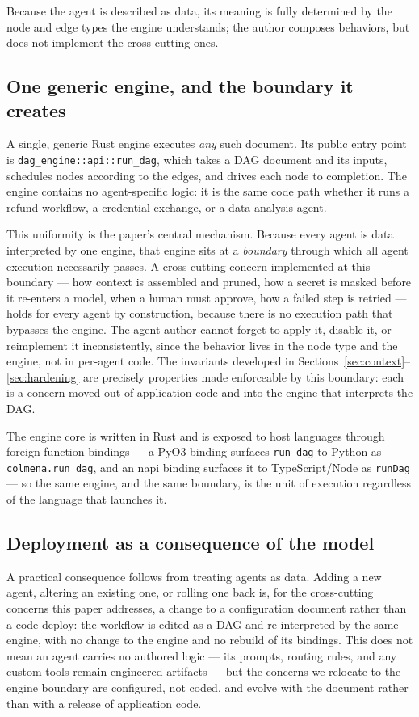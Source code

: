 Because the agent is described as data, its meaning is fully determined by the
node and edge types the engine understands; the author composes behaviors, but
does not implement the cross-cutting ones.

\subsection{One generic engine, and the boundary it creates}
\label{subsec:engine}

A single, generic Rust engine executes \emph{any} such document. Its public entry
point is \texttt{dag\_engine::\allowbreak api::\allowbreak run\_dag}, which takes
a DAG document and its
inputs, schedules nodes according to the edges, and drives each node to
completion. The engine contains no agent-specific logic: it is the same code path
whether it runs a refund workflow, a credential exchange, or a data-analysis
agent.

This uniformity is the paper's central mechanism. Because every agent is data
interpreted by one engine, that engine sits at a \emph{boundary} through which all
agent execution necessarily passes. A cross-cutting concern implemented at this
boundary --- how context is assembled and pruned, how a secret is masked before
it re-enters a model, when a human must approve, how a failed step is retried ---
holds for every agent by construction, because there is no execution path that
bypasses the engine. The agent author cannot forget to apply it, disable it, or
reimplement it inconsistently, since the behavior lives in the node type and the
engine, not in per-agent code. The invariants developed in
Sections~\ref{sec:context}--\ref{sec:hardening} are precisely properties made
enforceable by this boundary: each is a concern moved out of application code and
into the engine that interprets the DAG.

The engine core is written in Rust and is exposed to host languages through
foreign-function bindings --- a PyO3 binding surfaces \texttt{run\_dag} to Python
as \texttt{colmena.run\_dag}, and an napi binding surfaces it to
TypeScript/Node as \texttt{runDag} --- so the same engine, and the same boundary,
is the unit of execution regardless of the language that launches it.

\subsection{Deployment as a consequence of the model}
\label{subsec:deployment}

A practical consequence follows from treating agents as data. Adding a new agent,
altering an existing one, or rolling one back is, for the cross-cutting concerns
this paper addresses, a change to a configuration document rather than a code
deploy: the workflow is edited as a DAG and re-interpreted by the same engine,
with no change to the engine and no rebuild of its bindings. This does not mean an
agent carries no authored logic --- its prompts, routing rules, and any custom
tools remain engineered artifacts --- but the concerns we relocate to the engine
boundary are configured, not coded, and evolve with the document rather than with
a release of application code.
